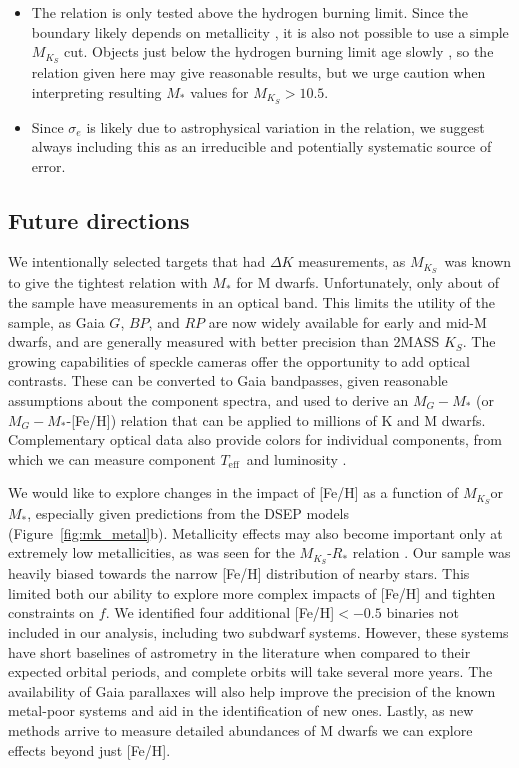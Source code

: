 \documentclass[twocolumn]{aastex62}
\newcommand\teff{\ensuremath{T_\text{eff}}}
\newcommand{\mks}{$M_{K_S}$}
\begin{document}
\begin{itemize}
\item The relation is only tested above the hydrogen burning limit. Since the boundary likely depends on metallicity \citep{2001RvMP...73..719B}, it is also not possible to use a simple $M_{K_S}$ cut. Objects just below the hydrogen burning limit age slowly \citep{BHAC15}, so the relation given here may give reasonable results, but we urge caution when interpreting resulting $M_*$ values for $M_{K_S}>10.5$. 

\item Since $\sigma_e$ is likely due to astrophysical variation in the relation, we suggest always including this as an irreducible and potentially systematic source of error. 

\end{itemize}


\subsection{Future directions}

We intentionally selected targets that had $\Delta K$ measurements, as \mks\ was known to give the tightest relation with $M_*$ for M dwarfs. Unfortunately, only about  of the sample have measurements in an optical band. This limits the utility of the sample, as Gaia $G$, $BP$, and $RP$ are now widely available for early and mid-M dwarfs, and are generally measured with better precision than 2MASS $K_S$. The growing capabilities of speckle cameras \citep[e.g.,][]{2009AJ....137.5057H} offer the opportunity to add optical contrasts. These can be converted to Gaia bandpasses, given reasonable assumptions about the component spectra, and used to derive an $M_{G}-M_*$ (or $M_G-M_*$-[Fe/H]) relation that can be applied to millions of K and M dwarfs. Complementary optical data also provide colors for individual components, from which we can measure component \teff\ and luminosity \citep[e.g.,][]{2017ApJ...845...72K}.

We would like to explore changes in the impact of [Fe/H] as a function of \mks or $M_*$, especially given predictions from the DSEP models (Figure~\ref{fig:mk_metal}b). Metallicity effects may also become important only at extremely low metallicities, as was seen for the \mks-$R_*$ relation \citep{Kesseli2018b}. Our sample was heavily biased towards the narrow [Fe/H] distribution of nearby stars. This limited both our ability to explore more complex impacts of [Fe/H] and tighten constraints on $f$. We identified four additional [Fe/H]$<-0.5$ binaries not included in our analysis, including two subdwarf systems. However, these systems have short baselines of astrometry in the literature when compared to their expected orbital periods, and complete orbits will take several more years. The availability of Gaia parallaxes will also help improve the precision of the known metal-poor systems and aid in the identification of new ones. Lastly, as new methods arrive to measure detailed abundances of M dwarfs \citep{Veyette2016a,Veyette2017} we can explore effects beyond just [Fe/H]. 
\end{document}
